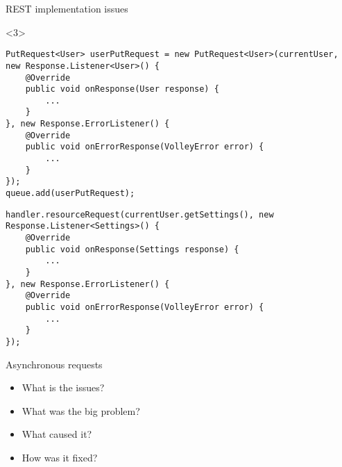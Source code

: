 \begin{frame}[fragile]{REST implementation issues}

\begin{onlyenv}<3>
\begin{center}
\begin{minipage}[H]{0.9\linewidth}
\begin{lstlisting}    
PutRequest<User> userPutRequest = new PutRequest<User>(currentUser, new Response.Listener<User>() {
	@Override
    public void onResponse(User response) {
    	...
    }
}, new Response.ErrorListener() {
    @Override
    public void onErrorResponse(VolleyError error) {
		...
    }
});
queue.add(userPutRequest);
\end{lstlisting} 
\begin{lstlisting}
handler.resourceRequest(currentUser.getSettings(), new Response.Listener<Settings>() {
	@Override
	public void onResponse(Settings response) {
		...	
	}
}, new Response.ErrorListener() {
	@Override
    public void onErrorResponse(VolleyError error) {
    	...
    }
});
\end{lstlisting} 
\end{minipage}
\end{center}
\end{onlyenv}
\end{frame}


\begin{frame}{Asynchronous requests}
\begin{itemize}
  \item What is the issues?
  \item What was the big problem?
  \item What caused it?
  \item How was it fixed?
\end{itemize}
\end{frame}

